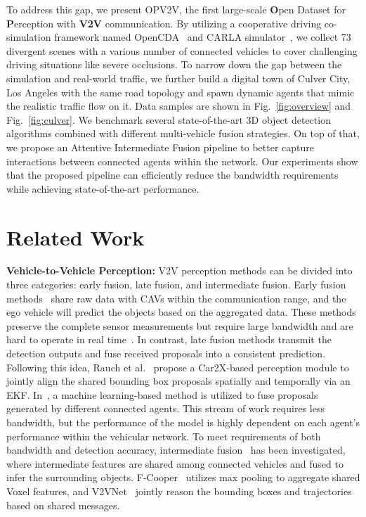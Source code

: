 \documentclass[letterpaper, 10 pt, conference]{ieeeconf}
\makeatletter
\newcommand{\etal}{{et al}.\@ }
\makeatother
\begin{document}
To address this gap, we present OPV2V, the first large-scale \textbf{O}pen Dataset for \textbf{P}erception with \textbf{V2V} communication. By utilizing a cooperative driving co-simulation framework named OpenCDA~\cite{xu2021opencda} and CARLA simulator~\cite{Dosovitskiy17}, we collect 73 divergent scenes with a various number of connected vehicles to cover challenging driving situations like severe occlusions. To narrow down the gap between the simulation and real-world traffic, we further build a digital town of Culver City, Los Angeles with the same road topology and spawn dynamic agents that mimic the realistic traffic flow on it.  Data samples are shown in Fig.~\ref{fig:overview} and Fig.~\ref{fig:culver}. We benchmark several state-of-the-art 3D object detection algorithms combined with different multi-vehicle fusion strategies. On top of that, we propose an Attentive Intermediate Fusion pipeline to better capture interactions between connected agents within the network. Our experiments show that the proposed pipeline can efficiently reduce the bandwidth requirements while achieving state-of-the-art performance.

\section{Related Work}
\noindent\textbf{Vehicle-to-Vehicle Perception: }V2V perception methods can be divided into three categories: early fusion, late fusion, and intermediate fusion. Early fusion methods~\cite{cooper} share raw data with CAVs within the communication range, and the ego vehicle will predict the objects based on the aggregated data. These methods preserve the complete sensor measurements but require large bandwidth and are hard to operate in real time~\cite{Wang2020V2VNetVC}. In contrast, late fusion methods transmit the detection outputs and fuse received proposals into a consistent prediction. Following this idea, Rauch \etal~\cite{Rauch2012} propose a Car2X-based perception module to jointly align the shared bounding box proposals spatially and temporally via an EKF. In~\cite{Rawashdeh2018}, a machine learning-based method is utilized to fuse proposals generated by different connected agents. This stream of work requires less bandwidth, but the performance of the model is highly dependent on each agent's performance within the vehicular network. To meet requirements of both bandwidth and detection accuracy, intermediate fusion~\cite{f-cooper, Wang2020V2VNetVC} has been investigated, where intermediate features are shared among connected vehicles and fused to infer the surrounding objects. F-Cooper~\cite{f-cooper} utilizes max pooling to aggregate shared Voxel features, and V2VNet~\cite{Wang2020V2VNetVC} jointly reason the bounding boxes and trajectories based on shared messages. 
\end{document}
